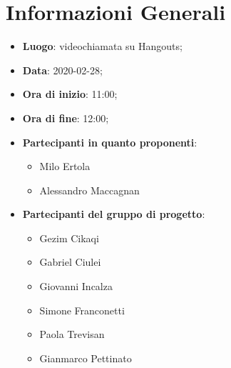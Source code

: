 \section{Informazioni Generali}
	\begin{itemize}
		\item \textbf {Luogo}: videochiamata su Hangouts;
		\item \textbf {Data}: 2020-02-28;
		\item \textbf {Ora di inizio}: 11:00;
		\item \textbf {Ora di fine}: 12:00;
		\item \textbf {Partecipanti in quanto proponenti}:
		  \begin{itemize}
		    \item Milo Ertola
		    \item Alessandro Maccagnan
		  \end{itemize}
		\item \textbf {Partecipanti del gruppo di progetto}:
			\begin{itemize}
				\item Gezim Cikaqi
				\item Gabriel Ciulei
				\item Giovanni Incalza
				\item Simone Franconetti
				\item Paola Trevisan
				\item Gianmarco Pettinato
			\end{itemize}
	\end{itemize}
